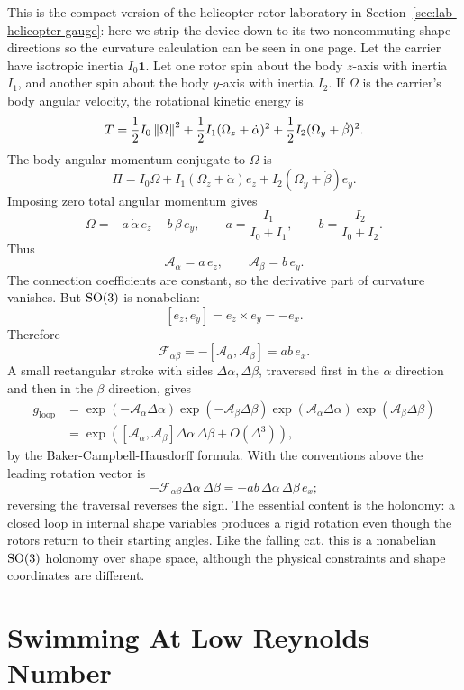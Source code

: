 This is the compact version of the helicopter-rotor laboratory in
Section~\ref{sec:lab-helicopter-gauge}: here we strip the device down to its
two noncommuting shape directions so the curvature calculation can be seen in
one page.
Let the carrier have isotropic inertia \(I_0\mathbf 1\). Let one rotor spin
about the body \(z\)-axis with inertia \(I_1\), and another spin about the
body \(y\)-axis with inertia \(I_2\). If \(\Omega\) is the carrier's body
angular velocity, the rotational kinetic energy is
\[
  T=
  \frac12I_0\left\lVert \Omega\right\rVert^2
  +
  \frac12I_1(\Omega_z+\dot\alpha)^2
  +
  \frac12I_2(\Omega_y+\dot\beta)^2.
\]
The body angular momentum conjugate to \(\Omega\) is
\[
  \Pi
  =
  I_0\Omega
  +
  I_1(\Omega_z+\dot\alpha)e_z
  +
  I_2(\Omega_y+\dot\beta)e_y.
\]
Imposing zero total angular momentum gives
\[
  \Omega
  =
  -a\,\dot\alpha\,e_z
  -
  b\,\dot\beta\,e_y,
  \qquad
  a=\frac{I_1}{I_0+I_1},
  \qquad
  b=\frac{I_2}{I_0+I_2}.
\]
Thus
\[
  \mathcal A_\alpha=a\,e_z,
  \qquad
  \mathcal A_\beta=b\,e_y.
\]
The connection coefficients are constant, so the derivative part of curvature
vanishes. But \(\operatorname{SO}(3)\) is nonabelian:
\[
  [e_z,e_y]=e_z\times e_y=-e_x.
\]
Therefore
\[
  \mathcal F_{\alpha\beta}
  =
  -[\mathcal A_\alpha,\mathcal A_\beta]
  =
  ab\,e_x.
\]
A small rectangular stroke with sides \(\Delta\alpha,\Delta\beta\), traversed
first in the \(\alpha\) direction and then in the \(\beta\) direction, gives
\[
\begin{aligned}
  g_{\mathrm{loop}}
  &=
  \exp(-\mathcal A_\alpha\Delta\alpha)
  \exp(-\mathcal A_\beta\Delta\beta)
  \exp(\mathcal A_\alpha\Delta\alpha)
  \exp(\mathcal A_\beta\Delta\beta)\\
  &=
  \exp\!\left(
    [\mathcal A_\alpha,\mathcal A_\beta]
    \Delta\alpha\,\Delta\beta
    +O(\Delta^3)
  \right),
\end{aligned}
\]
by the Baker-Campbell-Hausdorff formula. With the conventions above the
leading rotation vector is
\[
  -\mathcal F_{\alpha\beta}\Delta\alpha\,\Delta\beta
  =
  -ab\,\Delta\alpha\,\Delta\beta\,e_x;
\]
reversing the traversal reverses the sign. The essential content is the
holonomy: a closed loop in internal shape variables produces a rigid rotation
even though the rotors return to their starting angles. Like the falling cat,
this is a nonabelian \(\operatorname{SO}(3)\) holonomy over shape space, although the
physical constraints and shape coordinates are different.

\section{Swimming At Low Reynolds Number}
\label{sec:low-reynolds-swimming}

